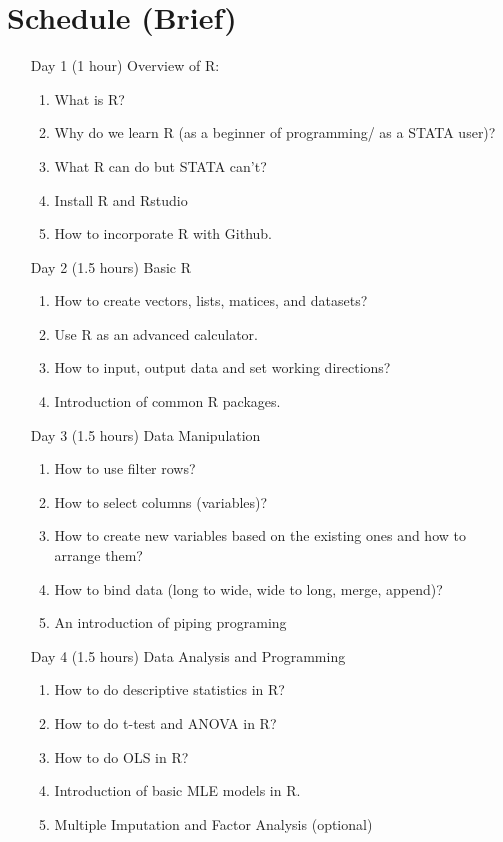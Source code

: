 \documentclass[12pt]{scrartcl}
\begin{document}
\section{Schedule (Brief)}
\begin{itemize}
	\item[Day 1] (1 hour) Overview of R:
		\begin{enumerate}
			\item What is R?
			\item Why do we learn R (as a beginner of programming/ as a STATA user)?
			\item What R can do but STATA can't?
			\item Install R and Rstudio
			\item How to incorporate R with Github.
		\end{enumerate}
	\item[Day 2] (1.5 hours) Basic R
		\begin{enumerate}
			\item How to create vectors, lists, matices, and datasets?
			\item Use R as an advanced calculator.
			\item How to input, output data and set working directions?
			\item Introduction of common R packages. 
		\end{enumerate}
	\item[Day 3] (1.5 hours) Data Manipulation
		\begin{enumerate}
			\item How to use filter rows?
			\item How to select columns (variables)?
			\item How to create new variables based on the existing ones and how to arrange them?
			\item How to bind data (long to wide, wide to long, merge, append)?
			\item An introduction of piping programing
		\end{enumerate}
	\item[Day 4] (1.5 hours) Data Analysis and Programming
		\begin{enumerate}
			\item How to do descriptive statistics in R? 
			\item How to do t-test and ANOVA in R?
			\item How to do OLS in R?
			\item Introduction of basic MLE models in R.
			\item Multiple Imputation and Factor Analysis (optional)

\end{enumerate}
\end{itemize}
\end{document}
